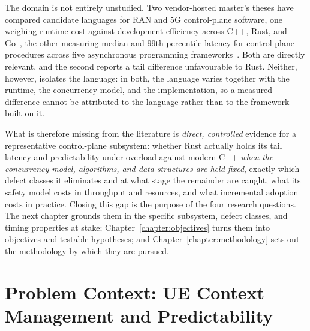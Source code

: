\documentclass[english,twoside,openright,a4paper,censored,csm,software-track-2020]{HYthesisML}
\begin{document}
The domain is not entirely unstudied. Two vendor-hosted master's theses have compared
candidate languages for RAN and 5G control-plane software, one weighing runtime cost against
development efficiency across C++, Rust, and Go~\cite{karlback2021ran}, the other measuring
median and 99th-percentile latency for control-plane procedures across five asynchronous
programming frameworks~\cite{arvidsson2025async}. Both are directly relevant, and the second
reports a tail difference unfavourable to Rust. Neither, however, isolates the language:
in both, the language varies together with the runtime, the concurrency model, and the
implementation, so a measured difference cannot be attributed to the language rather than to
the framework built on it.

What is therefore missing from the literature
is \emph{direct, controlled} evidence for a representative control-plane subsystem: whether
Rust actually holds its tail latency and predictability under overload against modern C++
\emph{when the concurrency model, algorithms, and data structures are held fixed},
exactly which defect classes it eliminates and at what stage the remainder are caught, what
its safety model costs in throughput and resources, and what incremental adoption costs in
practice. Closing this gap is the purpose of the four research questions. The next chapter
grounds them in the specific subsystem, defect classes, and timing properties at stake;
Chapter~\ref{chapter:objectives} turns them into objectives and testable hypotheses; and
Chapter~\ref{chapter:methodology} sets out the methodology by which they are pursued.

\chapter{Problem Context: UE Context Management and Predictability\label{chapter:context}}
\end{document}
